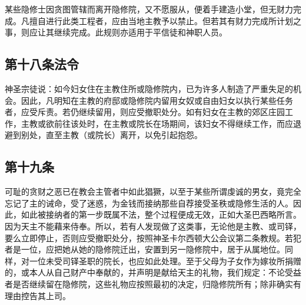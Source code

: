 \par

某些隐修士因贪图管辖而离开隐修院，又不愿服从，便着手建造小堂，但无财力完成。凡擅自进行此类工程者，应由当地主教予以禁止。但若其有财力完成所计划之事，则应让其继续完成。此规则亦适用于平信徒和神职人员。\par

\par


\subsection{第十八条法令}

\par

神圣宗徒说：\newline{}如今妇女住在主教住所或隐修院内，已为许多人制造了严重失足的机会。因此，凡明知在主教的府邸或隐修院内留用女奴或自由妇女以执行某些任务者，应受斥责。若仍继续留用，则应受撤职处分。如有妇女在主教的郊区庄园工作，主教或欲前往该处时，在主教或院长在场期间，该妇女不得继续工作，而应退避到别处，直至主教（或院长）离开，以免引起抱怨。\par

\par


\subsection{第十九条}

\par

可耻的贪财之恶已在教会主管者中如此猖獗，以至于某些所谓虔诚的男女，竟完全忘记了主的诫命，受了迷惑，为金钱而接纳那些自荐接受圣秩或隐修生活的人。因此，如此被接纳者的第一步既属不法，整个过程便成无效，正如大圣巴西略所言。因为天主不能藉来侍奉。所以，若有人发现做了这类事，无论他是主教、或司铎，要么立即停止，否则应受撤职处分，按照神圣卡尔西顿大公会议第二条教规。若犯者是一位，应把她从她的隐修院迁出，安置到另一隐修院中，居于从属地位。同样，对一位未受司铎圣职的院长，也应如此处理。至于父母为子女作为嫁妆所捐赠的，或本人从自己财产中奉献的，并声明是献给天主的礼物，我们规定：不论受益者是否继续留在隐修院，这些礼物应按照最初的决定，归隐修院所有；除非确实有理由控告其上司。\par

